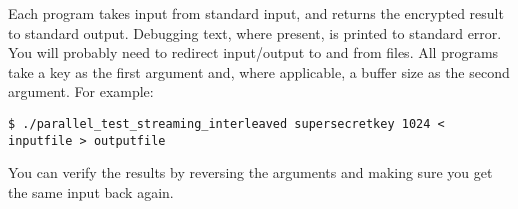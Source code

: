 \documentclass{article}
\begin{document}
  Each program takes input from standard input, and returns the encrypted result to standard output. Debugging text, where present, is printed to standard error. You will probably need to redirect input/output to and from files.
  All programs take a key as the first argument and, where applicable, a buffer size as the second argument. For example:
  
  \texttt{\$ ./parallel\_test\_streaming\_interleaved supersecretkey 1024 < inputfile > outputfile}
  
  You can verify the results by reversing the arguments and making sure you get the same input back again.
  
\end{document}

